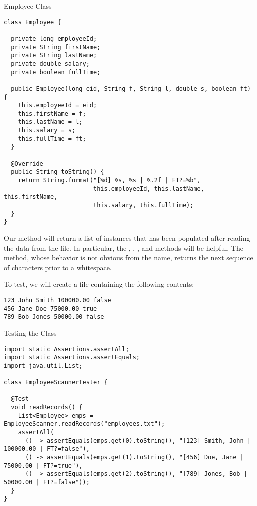 \begin{cl}[]{Employee Class}
\begin{lstlisting}[language=MyJava]
class Employee {

  private long employeeId;
  private String firstName;
  private String lastName;
  private double salary;
  private boolean fullTime;
  
  public Employee(long eid, String f, String l, double s, boolean ft) {
    this.employeeId = eid;
    this.firstName = f;
    this.lastName = l;
    this.salary = s;
    this.fullTime = ft;
  }

  @Override
  public String toString() {
    return String.format("[%d] %s, %s | %.2f | FT?=%b", 
                         this.employeeId, this.lastName, this.firstName, 
                         this.salary, this.fullTime);
  }
}
\end{lstlisting}
\end{cl}

Our method will return a list of  instances that has been populated after reading the data from the file. In particular, the , , , and  methods will be helpful. The  method, whose behavior is not obvious from the name, returns the next sequence of characters prior to a whitespace. 

To test, we will create a file containing the following contents:

\par{
\begin{verbatim}
123 John Smith 100000.00 false
456 Jane Doe 75000.00 true
789 Bob Jones 50000.00 false
\end{verbatim}
}

\begin{cl}[]{Testing the  Class}
\begin{lstlisting}[language=MyJava]
import static Assertions.assertAll;
import static Assertions.assertEquals;
import java.util.List;

class EmployeeScannerTester {

  @Test
  void readRecords() {
    List<Employee> emps = EmployeeScanner.readRecords("employees.txt");
    assertAll(
      () -> assertEquals(emps.get(0).toString(), "[123] Smith, John | 100000.00 | FT?=false"),
      () -> assertEquals(emps.get(1).toString(), "[456] Doe, Jane | 75000.00 | FT?=true"),
      () -> assertEquals(emps.get(2).toString(), "[789] Jones, Bob | 50000.00 | FT?=false"));
  }
}
\end{lstlisting}
\end{cl}

